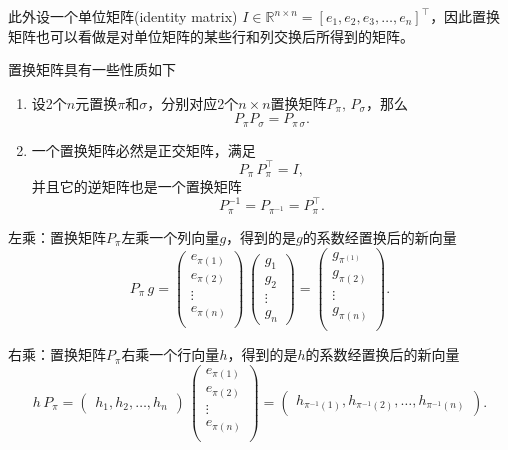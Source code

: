 \begin{subappendices}
此外设一个单位矩阵(identity matrix) $I \in \mathbb{R}^{n \times n} = \left[ e_{1}, e_{2}, e_{3}, \ldots, e_{n} \right]^{\top}$，因此置换矩阵也可以看做是对单位矩阵的某些行和列交换后所得到的矩阵。

置换矩阵具有一些性质如下
\begin{enumerate}
  \item 设2个$n$元置换$\pi$和$\sigma$，分别对应2个$n \times n$置换矩阵$P_{\pi}, \, P_{\sigma}$，那么
  \begin{equation*}
    P_{\pi} P_{\sigma} = P_{\pi \, \sigma}.
  \end{equation*}
  \item 一个置换矩阵必然是正交矩阵，满足
  \begin{equation*}
    P_{\pi} \, P_{\pi}^{\top} = I,
  \end{equation*}
  并且它的逆矩阵也是一个置换矩阵
  \begin{equation*}
    P_{\pi}^{-1} = P_{\pi^{-1}} = P_{\pi}^{\top}.
  \end{equation*}
\end{enumerate}

左乘：置换矩阵$P_{\pi}$左乘一个列向量$g$，得到的是$g$的系数经置换后的新向量
\begin{equation*}
  P_{\pi} \, g=
  \begin{pmatrix}
    e_{\pi(1)} \\
    e_{\pi(2)} \\
    \vdots \\
    e_{\pi(n)} \\
  \end{pmatrix}
  \,
  \begin{pmatrix}
    g_{1} \\ g_{2} \\ \vdots \\ g_{n}
  \end{pmatrix}
  =
  \begin{pmatrix}
    g_{\pi^(1)} \\
    g_{\pi(2)} \\
    \vdots \\
    g_{\pi(n)} \\
  \end{pmatrix}.
\end{equation*}

右乘：置换矩阵$P_{\pi}$右乘一个行向量$h$，得到的是$h$的系数经置换后的新向量
\begin{equation*}
  h \,   P_{\pi} =
  \begin{pmatrix}
    h_{1} , h_{2} , \ldots , h_{n}
  \end{pmatrix}
  \,
  \begin{pmatrix}
    e_{\pi(1)} \\
    e_{\pi(2)} \\
    \vdots \\
    e_{\pi(n)} \\
  \end{pmatrix}
  =
  \begin{pmatrix}
    h_{\pi^{-1}(1)} ,
    h_{\pi^{-1}(2)} ,
    \ldots,
    h_{\pi^{-1}(n)}
  \end{pmatrix}.
\end{equation*}


\end{subappendices}
